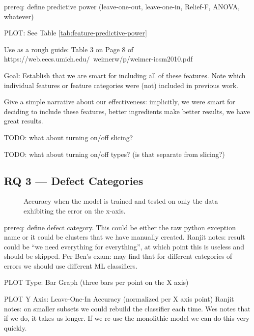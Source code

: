 \documentclass[conference]{IEEEtran}
\begin{document}
prereq: define predictive power (leave-one-out, leave-one-in, Relief-F,
ANOVA, whatever)

PLOT: See Table \ref{tab:feature-predictive-power}

Use as a rough guide: Table 3 on Page 8 of
https://web.eecs.umich.edu/~weimerw/p/weimer-icsm2010.pdf

Goal: Establish that we are smart for including all of these features. Note
which individual features or feature categories were (not) included in
previous work.

Give a simple narrative about our effectiveness: implicitly, we were smart
for deciding to include these features, better ingredients make better
results, we have great results.

TODO: what about turning on/off slicing?

TODO: what about turning on/off types? (is that separate from slicing?)

\subsection{RQ 3 --- Defect Categories}

\begin{figure}
\caption{Accuracy when the model is trained and tested on only the data exhibiting
the error on the x-axis.}
\label{fig:defect-categories}
\end{figure}

prereq: define defect category. This could be either the raw python
exception name or it could be clusters that we have manually created.
Ranjit notes: result could be ``we need everything for everything'', at
which point this is useless and should be skipped. Per Ben's exam: may find
that for different categories of errors we should use different ML
classifiers.

PLOT Type: Bar Graph (three bars per point on the X axis)

PLOT Y Axis: Leave-One-In Accuracy (normalized per X axis point)
Ranjit notes: on smaller subsets we could rebuild the classifier each time.
Wes notes that if we do, it takes us longer. If we re-use the monolithic
model we can do this very quickly.
\end{document}
